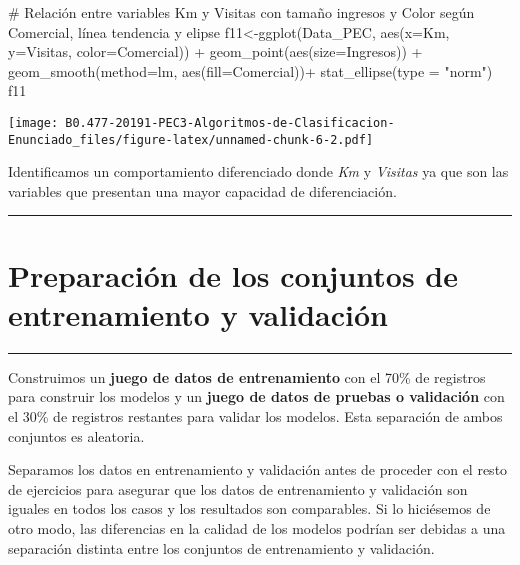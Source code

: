 \documentclass[]{article}
\newenvironment{Shaded}{\begin{snugshade}}{\end{snugshade}}
\newcommand{\KeywordTok}[1]{\textcolor[rgb]{0.94,0.87,0.69}{#1}}
\newcommand{\DataTypeTok}[1]{\textcolor[rgb]{0.87,0.87,0.75}{#1}}
\newcommand{\StringTok}[1]{\textcolor[rgb]{0.80,0.58,0.58}{#1}}
\newcommand{\CommentTok}[1]{\textcolor[rgb]{0.50,0.62,0.50}{#1}}
\newcommand{\OperatorTok}[1]{\textcolor[rgb]{0.94,0.94,0.82}{#1}}
\newcommand{\NormalTok}[1]{\textcolor[rgb]{0.80,0.80,0.80}{#1}}
\begin{document}
\begin{Shaded}
\begin{Highlighting}[]
\CommentTok{# Relación entre variables Km y Visitas con tamaño ingresos y Color según Comercial, línea tendencia y elipse}
\NormalTok{f11<-}\KeywordTok{ggplot}\NormalTok{(Data_PEC, }\KeywordTok{aes}\NormalTok{(}\DataTypeTok{x=}\NormalTok{Km, }\DataTypeTok{y=}\NormalTok{Visitas, }\DataTypeTok{color=}\NormalTok{Comercial)) }\OperatorTok{+}\StringTok{ }\KeywordTok{geom_point}\NormalTok{(}\KeywordTok{aes}\NormalTok{(}\DataTypeTok{size=}\NormalTok{Ingresos)) }\OperatorTok{+}\StringTok{ }\KeywordTok{geom_smooth}\NormalTok{(}\DataTypeTok{method=}\NormalTok{lm, }\KeywordTok{aes}\NormalTok{(}\DataTypeTok{fill=}\NormalTok{Comercial))}\OperatorTok{+}\StringTok{ }\KeywordTok{stat_ellipse}\NormalTok{(}\DataTypeTok{type =} \StringTok{"norm"}\NormalTok{)}
\NormalTok{f11}
\end{Highlighting}
\end{Shaded}

\texttt{[image: B0.477-20191-PEC3-Algoritmos-de-Clasificacion-Enunciado\_files/figure-latex/unnamed-chunk-6-2.pdf]}

Identificamos un comportamiento diferenciado donde \emph{Km} y
\emph{Visitas} ya que son las variables que presentan una mayor
capacidad de diferenciación.

\begin{center}\rule{0.5\linewidth}{\linethickness}\end{center}

\section{Preparación de los conjuntos de entrenamiento y
validación}\label{preparacion-de-los-conjuntos-de-entrenamiento-y-validacion}

\begin{center}\rule{0.5\linewidth}{\linethickness}\end{center}

Construimos un \textbf{juego de datos de entrenamiento} con el 70\% de
registros para construir los modelos y un \textbf{juego de datos de
pruebas o validación} con el 30\% de registros restantes para validar
los modelos. Esta separación de ambos conjuntos es aleatoria.

Separamos los datos en entrenamiento y validación antes de proceder con
el resto de ejercicios para asegurar que los datos de entrenamiento y
validación son iguales en todos los casos y los resultados son
comparables. Si lo hiciésemos de otro modo, las diferencias en la
calidad de los modelos podrían ser debidas a una separación distinta
entre los conjuntos de entrenamiento y validación.
\end{document}

